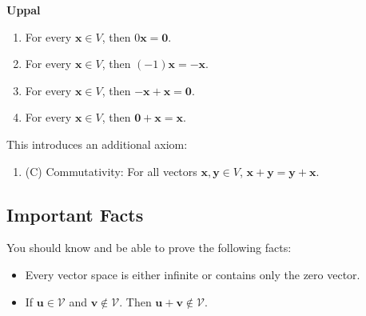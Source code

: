 \documentclass{article}
\newcommand{\bff}[1]{\mathbf{#1}}
\begin{document}
    \hfill
    \begin{minipage}[t]{.45\textwidth}
        \begin{center}
            \textbf{Uppal}
        \end{center}
        \begin{enumerate}[label = \textbf{Prop \Roman*.}, leftmargin=16mm]
            \item For every $\bff{x} \in V$, then $0\bff{x}=\bff{0}$.
            \item For every $\bff{x} \in V$, then $(-1)\bff{x} = \bff{-x}$.
            \item For every $\bff{x} \in V$, then $\bff{-x}+\bff{x}=\bff{0}$.
            \item For every $\bff{x} \in V$, then $\bff{0}+\bff{x}=\bff{x}$.
        \end{enumerate}
        \vspace{2mm}
        This introduces an additional axiom:
        \vspace{2mm}

        \begin{enumerate}[label=10.]
            \item (C) Commutativity: For all vectors $\bff{x}, \bff{y} \in V$, $\bff{x}+\bff{y}=\bff{y}+\bff{x}$.
        \end{enumerate}
        \vfill
    \end{minipage}
    \subsection{Important Facts}
    You should know and be able to prove the following facts:
    \begin{itemize}
        \item Every vector space is either infinite or contains only the zero vector. 
        \item If $\mathbf{u} \in \mathcal{V}$ and $\mathbf{v} \notin \mathcal{V}$. Then $\mathbf{u}+\mathbf{v} \notin \mathcal{V}$.
    \end{itemize}
\end{document}

